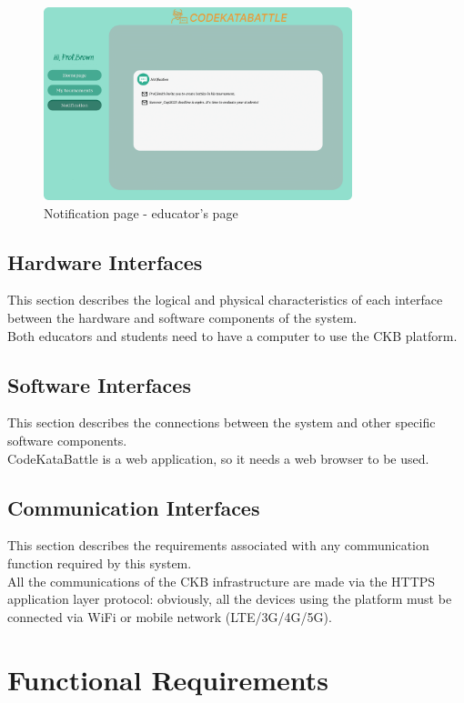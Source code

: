 \begin{figure}[H]
    \centering
    \includegraphics[width=0.8\textwidth]{images/user_interface/UI_sw2-15.png}
    \caption{Notification page - educator's page}
\end{figure}


\subsection{Hardware Interfaces}
This section describes the logical and physical characteristics of each interface 
between the hardware and software components of the system.\\
Both educators and students need to have a computer to use the CKB platform.
\subsection{Software Interfaces}
This section describes the connections between the system and other specific software components.\\
CodeKataBattle is a web application, so it needs a web browser to be used.
\subsection{Communication Interfaces}
This section describes the requirements associated with any communication function required
by this system.\\
All the communications of the CKB infrastructure are made via the HTTPS application layer
protocol: obviously, all the devices using the platform must be connected via WiFi or mobile
network (LTE/3G/4G/5G).

\section{Functional Requirements}
